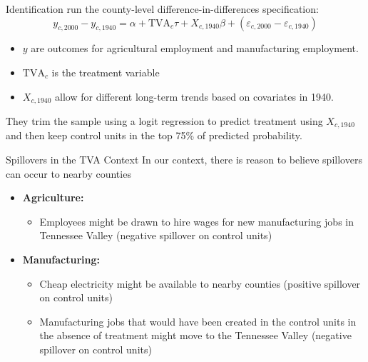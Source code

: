 \documentclass[aspectratio=169,t]{beamer}
\begin{document}
\begin{frame}{Identification}
    \citet{Kline_Moretti_2014a} run the county-level difference-in-differences  specification: 
    \begin{equation}\label{eq:tva_spillover}
        y_{c, 2000} - y_{c, 1940} = \alpha + \text{TVA}_c \tau + X_{c, 1940} \beta + (\varepsilon_{c, 2000} - \varepsilon_{c, 1940})
    \end{equation} 

    \begin{itemize}
        \item $y$ are outcomes for agricultural employment and manufacturing employment.
        \item $\text{TVA}_c$ is the treatment variable
        \item $X_{c, 1940}$ allow for different long-term trends based on covariates in 1940. 
    \end{itemize}

    They trim the sample using a logit regression to predict treatment using $X_{c,1940}$ and then keep control units in the top 75\% of predicted probability.
\end{frame}

\begin{frame}{Spillovers in the TVA Context}
    In our context, there is reason to believe spillovers can occur to nearby counties

    \begin{itemize}
        \item \textbf{Agriculture:} 
        \begin{itemize}
            \item Employees might be drawn to hire wages for new manufacturing jobs in Tennessee Valley (negative spillover on control units)
        \end{itemize}
        
        \item \textbf{Manufacturing:}
        \begin{itemize}
            \item Cheap electricity might be available to nearby counties (positive spillover on control units) 
            
            \item Manufacturing jobs that would have been created in the control units in the absence of treatment might move to the Tennessee Valley (negative spillover on control units)
        \end{itemize}
    \end{itemize}
\end{frame}
\end{document}
